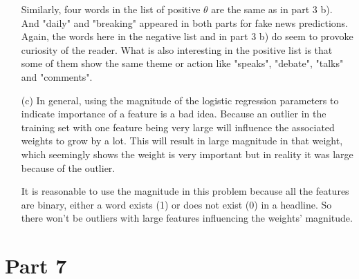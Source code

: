 \documentclass{article}
\begin{document}
\begin{enumerate}
Similarly, four words in the list of positive $\theta$ are the same as in part 3 b). And "daily" and "breaking" appeared in both parts for fake news predictions. Again, the words here in the negative list and in part 3 b) do seem to provoke curiosity of the reader. What is also interesting in the positive list is that some of them show the same theme or action like "speaks", "debate", "talks" and "comments".

\item[(c)]
In general, using the magnitude of the logistic regression parameters to indicate importance of a feature is a bad idea. Because an outlier in the training set with one feature being very large will influence the associated weights to grow by a lot. This will result in large magnitude in that weight, which seemingly shows the weight is very important but in reality it was large because of the outlier.

It is reasonable to use the magnitude in this problem because all the features are binary, either a word exists (1) or does not exist (0) in a headline. So there won't be outliers with large features influencing the weights' magnitude.
\end{enumerate}

\section*{Part 7}
\end{document}
